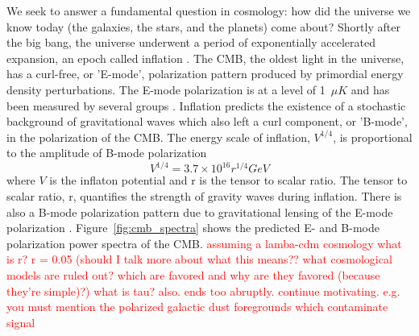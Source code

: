We seek to answer a fundamental question in cosmology:  how did the universe we know today (the galaxies, the stars, and the planets) come about?  
Shortly after the big bang, the universe underwent a period of exponentially accelerated expansion, an epoch called inflation \cite{Guth1981} \cite{Linde1982} \cite{peebles} \cite{Spergel2007} \cite{Tegmark2006} \cite{PlanckXIII} \cite{PlanckXX}.  
The \ac{CMB}, the oldest light in the universe, has a curl-free, or 'E-mode', polarization pattern produced by primordial energy density perturbations.
The E-mode polarization is at a level of 1~$\mu K$ and has been measured by several groups \cite{leitch2005} \cite{montroy2006} \cite{wu2007} \cite{sievers2007} \cite{nolta2009}. 
Inflation predicts the existence of a stochastic background of gravitational waves which also left a curl component, or 'B-mode', in the polarization of the \ac{CMB}.  
The energy scale of inflation, $V^{1/4}$, is proportional to the amplitude of B-mode polarization
\begin{equation}
V^{1/4} = 3.7 \times 10^{16}   r^{1/4}   GeV
\end{equation}
where $V$ is the inflaton potential and r is the tensor to scalar ratio. 
The tensor to scalar ratio, r, quantifies the strength of gravity waves during inflation.  
There is also a B-mode polarization pattern due to gravitational lensing of the E-mode polarization \cite{polarbear2014} \cite{naess2014} \cite{keisler2015}.
Figure~\ref{fig:cmb_spectra} shows the predicted E- and B-mode polarization power spectra of the \ac{CMB}.
\textcolor{red}{assuming a lamba-cdm cosmology 
what is r? r = 0.05 (should I talk more about what this means?? what cosmological models are ruled out? which are favored and why are they favored (because they're simple)?)
what is tau?
also. ends too abruptly. continue motivating.
e.g. you must mention the polarized galactic dust foregrounds which contaminate signal
}

